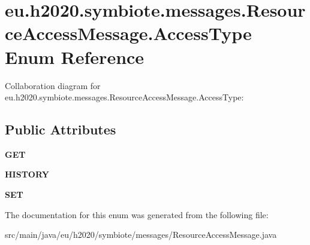 \hypertarget{enumeu_1_1h2020_1_1symbiote_1_1messages_1_1ResourceAccessMessage_1_1AccessType}{}\section{eu.\+h2020.\+symbiote.\+messages.\+Resource\+Access\+Message.\+Access\+Type Enum Reference}
\label{enumeu_1_1h2020_1_1symbiote_1_1messages_1_1ResourceAccessMessage_1_1AccessType}


Collaboration diagram for eu.\+h2020.\+symbiote.\+messages.\+Resource\+Access\+Message.\+Access\+Type\+:
\subsection*{Public Attributes}
\begin{DoxyCompactItemize}
\item 
\mbox{\label{enumeu_1_1h2020_1_1symbiote_1_1messages_1_1ResourceAccessMessage_1_1AccessType_adad1d52caec3845f39d9a0acf85b4617}} 
{\bfseries G\+ET}
\item 
\mbox{\label{enumeu_1_1h2020_1_1symbiote_1_1messages_1_1ResourceAccessMessage_1_1AccessType_a6e1bc321fdc43688f1124bf9f63bf001}} 
{\bfseries H\+I\+S\+T\+O\+RY}
\item 
\mbox{\label{enumeu_1_1h2020_1_1symbiote_1_1messages_1_1ResourceAccessMessage_1_1AccessType_a6654745b5b096e052fa79d4f035cc8c5}} 
{\bfseries S\+ET}
\end{DoxyCompactItemize}


The documentation for this enum was generated from the following file\+:\begin{DoxyCompactItemize}
\item 
src/main/java/eu/h2020/symbiote/messages/Resource\+Access\+Message.\+java\end{DoxyCompactItemize}
